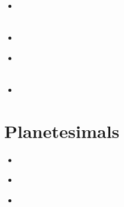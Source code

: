 \begin{small}
\begin{itemize}
\item[\twothousandone]
 \\ 
 \\
\item[\twothousandthirteen] 
\item[\twothousandtwenty] 
 \\ 
 \\
\item[\twothousandtwentytwo] 
\end{itemize}
\end{small}

\section{Planetesimals}

\begin{small}
\begin{itemize}
\item[\twothousandfourteen]
\item[\twothousandnineteen]
 \\
\item[\twothousandtwentyone]
\end{itemize}
\end{small}


